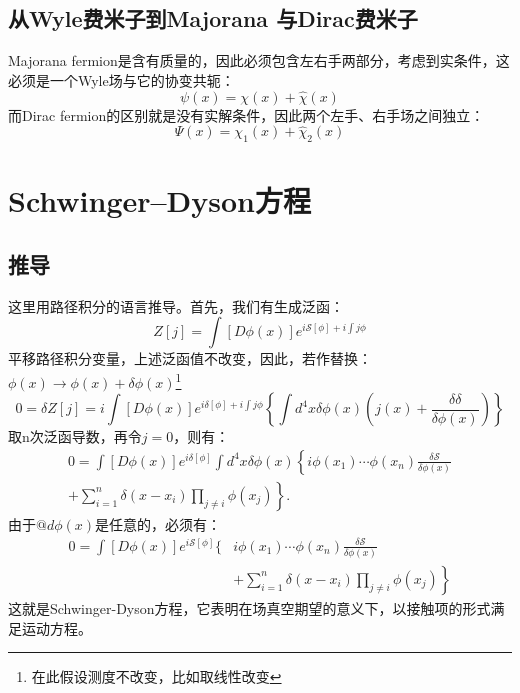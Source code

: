\documentclass{article}
\begin{document}
\subsection{从Wyle费米子到Majorana 与Dirac费米子}
Majorana fermion是含有质量的，因此必须包含左右手两部分，考虑到实条件，这必须是一个Wyle场与它的协变共轭：
\begin{equation}
  \psi(x)=\chi(x)+\widehat{\chi}(x)
\end{equation}
而Dirac fermion的区别就是没有实解条件，因此两个左手、右手场之间独立：
\begin{equation}
  \Psi(x)=\chi_1(x)+\widehat{\chi}_2(x)
\end{equation}
\section{Schwinger–Dyson方程}
\subsection{推导}
这里用路径积分的语言推导。首先，我们有生成泛函：
\begin{equation}
  Z[j]=\int[D \phi(x)] e^{i \mathcal{S}[\phi]+i \int j \phi}
\end{equation}
平移路径积分变量，上述泛函值不改变，因此，若作替换：$ \phi(x) \rightarrow \phi(x)+\delta \phi(x) $\footnote{在此假设测度不改变，比如取线性改变}
\begin{equation}
  0=\delta Z[j]=i \int[D \phi(x)] e^{i \delta[\phi]+i \int j \phi}\left\{\int d^4 x \delta \phi(x)\left(j(x)+\frac{\delta \delta}{\delta \phi(x)}\right)\right\}
\end{equation} 
取n次泛函导数，再令$ j=0 $，则有：
\begin{equation}
  \begin{gathered}
    0=\int[D \phi(x)] e^{i \delta[\phi]} \int d^4 x \delta \phi(x)\left\{i \phi\left(x_1\right) \cdots \phi\left(x_n\right) \frac{\delta \mathcal{S}}{\delta \phi(x)}\right. \\
    \left.+\sum_{i=1}^n \delta\left(x-x_i\right) \prod_{j \neq i} \phi\left(x_j\right)\right\} .
    \end{gathered}
  \label{sde}
\end{equation} 
由于$ @d\phi(x) $是任意的，必须有：
\begin{equation}
  \begin{aligned}
    0=\int[D \phi(x)] e^{i \mathcal{S}[\phi]}\{ & i \phi\left(x_1\right) \cdots \phi\left(x_n\right) \frac{\delta \mathcal{S}}{\delta \phi(x)} \\
    & \left.+\sum_{i=1}^n \delta\left(x-x_i\right) \prod_{j \neq i} \phi\left(x_j\right)\right\}
    \end{aligned}
\end{equation} 
这就是Schwinger-Dyson方程，它表明在场真空期望的意义下，以接触项的形式满足运动方程。
\end{document}
